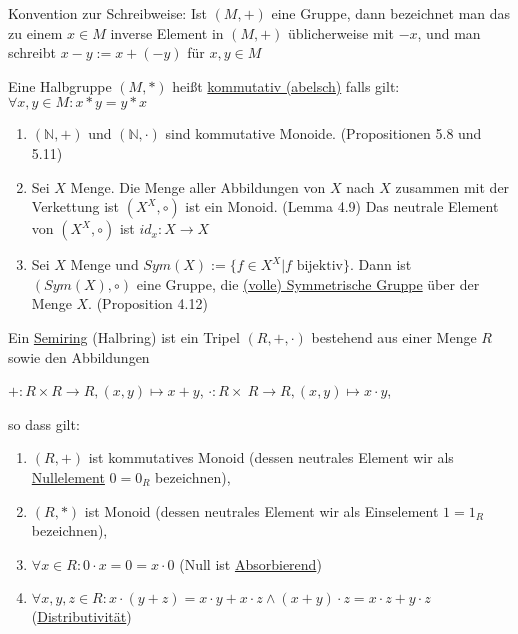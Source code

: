 \documentclass{../../meta/tudscript}
\begin{document}
Konvention zur Schreibweise: Ist \((M,+)\) eine Gruppe, dann bezeichnet
man das zu einem \(x \in M\) inverse Element in \((M,+)\) üblicherweise
mit \(-x\), und man schreibt \(x-y:=x+(-y)\) für \(x,y \in M\)


Eine Halbgruppe \((M,*)\) heißt \underline{kommutativ (abelsch)} falls
gilt: \(\forall x,y \in M: x*y=y*x\)


\begin{enumerate}

\item
  \((\mathbb{N},+)\) und \((\mathbb{N},\cdot )\) sind kommutative
  Monoide. (Propositionen 5.8 und 5.11)
\item
  Sei \(X\) Menge. Die Menge aller Abbildungen von \(X\) nach \(X\)
  zusammen mit der Verkettung ist \((X^X,\circ )\) ist ein Monoid.
  (Lemma 4.9) Das neutrale Element von \((X^X ,\circ )\) ist
  \(id_x :X \rightarrow X\)
\item
  Sei \(X\) Menge und \(Sym(X):=\{ f \in X^X | f \text{ bijektiv} \}\).
  Dann ist \((Sym(X),\circ )\) eine Gruppe, die
  \underline{(volle) Symmetrische Gruppe} über der Menge \(X\).
  (Proposition 4.12)
\end{enumerate}


Ein \underline{Semiring} (Halbring) ist ein Tripel \((R,+,\cdot )\)
bestehend aus einer Menge \(R\) sowie den Abbildungen

\(+:R \times R \rightarrow R, (x,y) \mapsto x+y\),
\(\cdot : R \times\ R \rightarrow R, (x,y) \mapsto x\cdot y\),

so dass gilt:

\begin{enumerate}

\item
  \((R,+)\) ist kommutatives Monoid (dessen neutrales Element wir als
  \underline{Nullelement} \(0=0_R\) bezeichnen),
\item
  \((R,*)\) ist Monoid (dessen neutrales Element wir als Einselement
  \(1=1_R\) bezeichnen),
\item
  \(\forall x \in R: 0 \cdot x = 0 = x \cdot 0\) (Null ist
  \underline{Absorbierend})
\item
  \(\forall x,y,z \in R: x \cdot(y+z)=x \cdot y + x \cdot z \land (x+y) \cdot z = x \cdot z + y \cdot z\)
  (\underline{Distributivität})
\end{enumerate}
\end{document}
